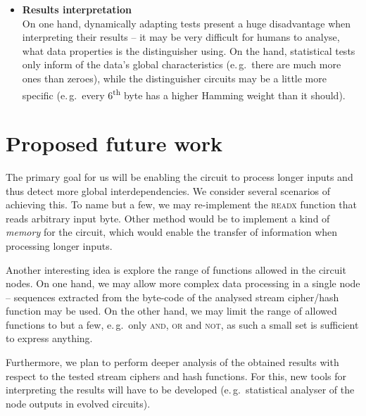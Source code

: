\documentclass[12pt,oneside]{fithesis2}		%
\renewcommand{\_}{\leavevmode \kern0.0em\vbox{\hrule width0.4em}}
\newcommand{\squarebullet}{\textcolor{black}{\raisebox{0.15em}{\rule{4pt}{4pt}}}}
\newenvironment{myItemize}{
  \begin{itemize}[leftmargin=2em,rightmargin=1em,itemsep=\parskip ,parsep=0em,topsep=0em,partopsep=0em]
  \renewcommand{\labelitemi}{\squarebullet}
  \renewcommand{\labelitemii}{$\diamond$}
}{
  \end{itemize}
}
\begin{document}
\begin{myItemize}
by EACirc dynamically adapt to the data stream. Thus, if a data stream changes its properties, the test will evolve accordingly
(predefined statistical tests never change).
\item \textbf{Results interpretation}\\
On one hand, dynamically adapting tests present a huge disadvantage when interpreting their results -- it may be very difficult for
humans to analyse, what data properties is the distinguisher using. On the hand, statistical tests only inform of the data's global
characteristics (e.\,g.\ there are much more ones than zeroes), while the distinguisher circuits may be a little more specific 
(e.\,g.\ every 6\textsuperscript{th} byte has a higher Hamming weight than it should).
\end{myItemize}

\section{Proposed future work}
\label{sec:outro-future-work}

The primary goal for us will be enabling the circuit to process longer inputs and thus detect more global interdependencies.
We consider several scenarios of achieving this. To name but a few, we may re-implement the \textsc{readx} function that
reads arbitrary input byte. Other method would be to implement a kind of \textit{memory} for the circuit, which would enable
the transfer of information when processing longer inputs.

Another interesting idea is explore the range of functions allowed in the circuit nodes. On one hand, we may allow more complex
data processing in a single node -- sequences extracted from the byte-code of the analysed stream cipher/hash function may be used.
On the other hand, we may limit the range of allowed functions to but a few, e.\,g.\ only \textsc{and}, \textsc{or} and \textsc{not},
as such a small set is sufficient to express anything.

Furthermore, we plan to perform deeper analysis of the obtained results with respect to the tested stream ciphers and hash functions.
For this, new tools for interpreting the results will have to be developed 
(e.\,g.\ statistical analyser of the node outputs in evolved circuits).

\appendix

\nocite{*}
\printbibliography
\end{document}
